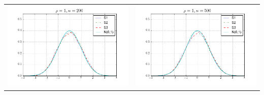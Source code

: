 \begin{table}[!ht]
{\begin{tabular}{c c}
\includegraphics[width=8cm]{alpha_t_ratio_200_1} & \includegraphics[width=8cm]{alpha_t_ratio_500_1} \\
\end{tabular}
}
\end{table}



